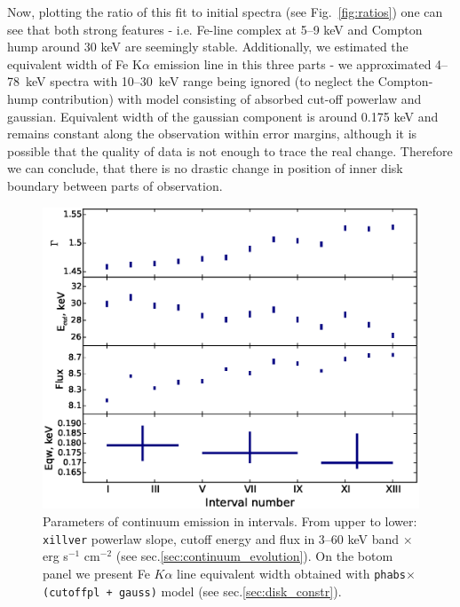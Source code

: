 \documentclass[a4paper,fleqn,usenatbib]{mnras}
\begin{document}
Now, plotting the ratio of this fit to initial spectra (see Fig.~\ref{fig:ratios}) one can see that both strong features - i.e. Fe-line complex at 5--9 keV and Compton hump around 30 keV are seemingly stable. 
Additionally, we estimated the equivalent width of  Fe K$\alpha$ emission line in this three parts - we approximated 4--78~keV spectra with 10--30~keV range being ignored (to neglect the Compton-hump contribution) with model consisting of absorbed cut-off powerlaw and gaussian. 
Equivalent width of the gaussian component is around 0.175 keV and remains constant along the observation within error margins, although it is possible that the quality of data is not enough to trace the real change.
Therefore we can conclude, that there is no drastic change in position of inner disk boundary between parts of observation. 

\begin{figure}
\centerline{\includegraphics[width=\linewidth]{intspe_v04.eps}}
\caption{Parameters of continuum emission in intervals. From upper to lower: \texttt{xillver} powerlaw slope, cutoff energy and  flux in 3--60 keV band $\times$\, erg s$^{-1}$ cm$^{-2}$ (see sec.\ref{sec:continuum_evolution}). On the botom panel we present Fe $K\alpha$ line equivalent width obtained with \texttt{phabs$\times$(cutoffpl + gauss)} model (see sec.\ref{sec:disk_constr}).} 
\label{fig:intspe}
\end{figure}  
\end{document}
